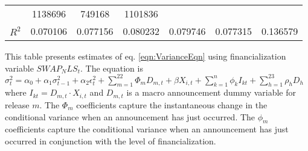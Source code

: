 \begin{sidewaystable}
{\begin{tabular}{@{}lllllllllllll@{}}
                                             & \multicolumn{2}{c}{ 1138696 }                                                 & \multicolumn{2}{c}{ 749168 }                                                   & \multicolumn{2}{c}{ 1101836 }                                                 \\ \textbf{$R^2$}             &\multicolumn{2}{c}{ 0.070106 }                                                 & \multicolumn{2}{c}{ 0.077156 }                                                 & \multicolumn{2}{c}{ 0.080232 }                                                 & \multicolumn{2}{c}{ 0.079746 }                                                 & \multicolumn{2}{c}{ 0.077315 }                                                   & \multicolumn{2}{c}{ 0.136579 }                                                 \\ \bottomrule 
\end{tabular}
}
\begin{tablenotes}\item 
        \singlespacing
        \footnotesize
        This table presents estimates of eq. \ref{eqn:VarianceEqn} using financialization variable $SWAP_NLS_t$. The equation is $\sigma_{t}^2=\alpha_0+\alpha_1 \sigma_{t-1}^2+\alpha_2 \epsilon_t^2 +\sum_{m=1}^{22} \Phi_m D_{m,t}+\beta X_{i,t}+\sum_{k=1}^n \phi_k I_{kt} + \sum_{h=1}^{23} \rho_h D_h$ where $I_{kt}=D_{m,t} \cdot X_{i,t}$ and $D_{m,t}$ is a macro announcement dummy variable for release $m$. The $\Phi_m$ coefficients capture the instantaneous change in the conditional variance when an announcement has just occurred. The $\phi_m$ coefficients capture the conditional variance when an announcement has just occurred in conjunction with the level of financialization.
\end{tablenotes}
\end{sidewaystable}



